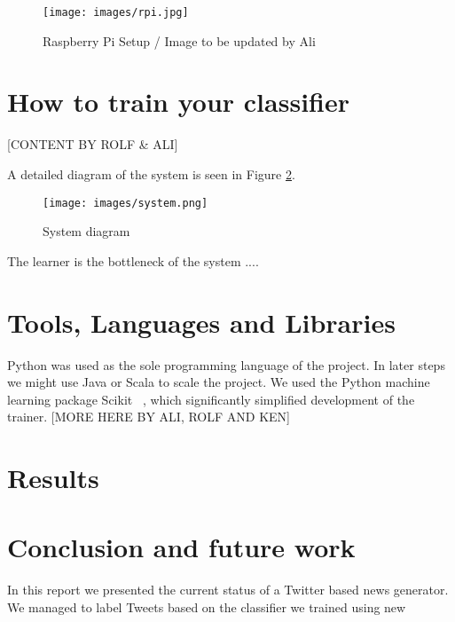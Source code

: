 \documentclass{llncs}
\begin{document}
\begin{figure}[H]
  \centering
  \texttt{[image: images/rpi.jpg]}
  \caption{Raspberry Pi Setup / Image to be updated by Ali}
  \label{fig:Raspberry Pi}
\end{figure}

\section{How to train your classifier}

[CONTENT BY ROLF \& ALI]

A detailed diagram of the system is seen in Figure \ref{fig:System diagram}.

\begin{figure}[H]
  \centering
  \texttt{[image: images/system.png]}
  \caption{System diagram}
  \label{fig:System diagram}
\end{figure}

The learner is the bottleneck of the system .... 

\section{Tools, Languages and Libraries}
Python was used as the sole programming language of the project.
In later steps we might use Java or Scala to scale the project.
We used the Python machine learning package Scikit ~\cite{scikit-learn}, which significantly simplified development of the trainer. 
[MORE HERE BY ALI, ROLF AND KEN]

\section{Results}

\section{Conclusion and future work}
In this report we presented the current status of a Twitter based news generator. We managed to label Tweets based on the classifier we trained using new 



\end{document}
